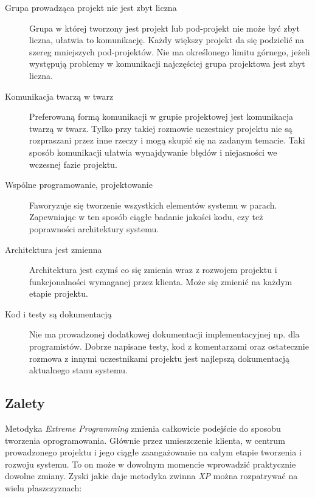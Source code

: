 \begin{description}
    \item[Grupa prowadząca projekt nie jest zbyt liczna] Grupa w której tworzony jest projekt lub pod-projekt nie może być zbyt liczna, ułatwia to komunikację. Każdy większy projekt da się podzielić na szereg mniejszych pod-projektów. Nie ma określonego limitu górnego, jeżeli występują problemy w komunikacji najczęściej grupa projektowa jest zbyt liczna.
    \item[Komunikacja twarzą w twarz] Preferowaną formą komunikacji w grupie projektowej jest komunikacja twarzą w twarz. Tylko przy takiej rozmowie uczestnicy projektu nie są rozpraszani przez inne rzeczy i mogą skupić się na zadanym temacie. Taki sposób komunikacji ułatwia wynajdywanie błędów i niejasności we wczesnej fazie projektu.
    \item[Wspólne programowanie, projektowanie] Faworyzuje się tworzenie wszystkich elementów systemu w parach. Zapewniając w ten sposób ciągłe badanie jakości kodu, czy też poprawności architektury systemu.
    \item[Architektura jest zmienna] Architektura jest czymś co się zmienia wraz z rozwojem projektu i funkcjonalności wymaganej przez klienta. Może się zmienić na każdym etapie projektu.
    \item[Kod i testy są dokumentacją] Nie ma prowadzonej dodatkowej dokumentacji implementacyjnej np. dla programistów. Dobrze napisane testy, kod z komentarzami oraz ostatecznie rozmowa z innymi uczestnikami projektu jest najlepszą dokumentacją aktualnego stanu systemu.
\end{description}

\subsection{Zalety}
\label{sec:ZMTOzalety}

Metodyka \textit{Extreme Programming} zmienia całkowicie podejście do sposobu tworzenia oprogramowania. Głównie przez umieszczenie klienta, w centrum prowadzonego projektu i jego ciągłe zaangażowanie na całym etapie tworzenia i rozwoju systemu. To on może w dowolnym momencie wprowadzić praktycznie dowolne zmiany. Zyski jakie daje metodyka zwinna \textit{XP} można rozpatrywać na wielu płaszczyznach:

